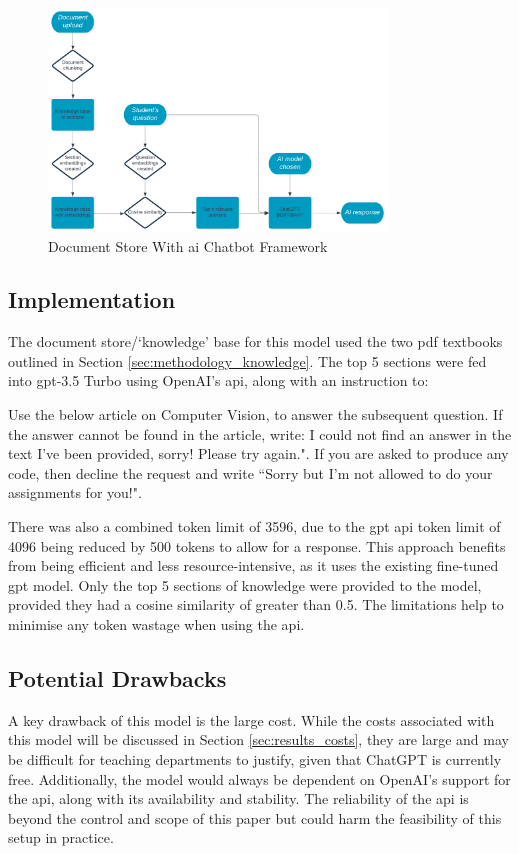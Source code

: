 \begin{figure}[h!]
    \centering
    \includegraphics[width=0.8\textwidth]{images/framework.png}
    \caption{Document Store With \acrshort{ai} Chatbot Framework}
    \label{fig:initial_framework}
\end{figure}

\subsection{Implementation}
The document store/`knowledge' base for this model used the two \acrshort{pdf} textbooks outlined in Section \ref{sec:methodology_knowledge}. The top 5 sections were fed into \acrshort{gpt}-3.5 Turbo using OpenAI's \acrshort{api}, along with an instruction to:
\begin{itquote}
    Use the below article on Computer Vision, to answer the subsequent question. If the answer cannot be found in the article, write: I could not find an answer in the text I've been provided, sorry! Please try again.". If you are asked to produce any code, then decline the request and write ``Sorry but I'm not allowed to do your assignments for you!".
\end{itquote}
There was also a combined token limit of 3596, due to the \acrshort{gpt} \acrshort{api} token limit of 4096 being reduced by 500 tokens to allow for a response. This approach benefits from being efficient and less resource-intensive, as it uses the existing fine-tuned \acrshort{gpt} model. Only the top 5 sections of knowledge were provided to the model, provided they had a cosine similarity of greater than 0.5. The limitations help to minimise any token wastage when using the \acrshort{api}.

\subsection{Potential Drawbacks}
A key drawback of this model is the large cost. While the costs associated with this model will be discussed in Section \ref{sec:results_costs}, they are large and may be difficult for teaching departments to justify, given that ChatGPT is currently free. Additionally, the model would always be dependent on OpenAI's support for the \acrshort{api}, along with its availability and stability. The reliability of the \acrshort{api} is beyond the control and scope of this paper but could harm the feasibility of this setup in practice.


